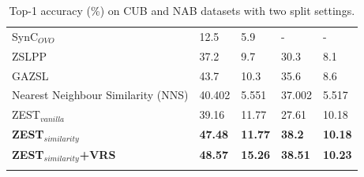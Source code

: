 \documentclass[11pt,a4paper]{article}
\begin{document}
\begin{table}[t]
{\begin{tabular}{l|ll|ll}
SynC$_{OVO}$ \citet{changpinyo2016synthesized}      & 12.5                              & 5.9                                & -                                 & -                                  \\
ZSLPP \citet{elhoseiny2017link}                   & 37.2                              & 9.7                                & 30.3                              & 8.1                                \\
GAZSL \citet{zhu2018generative}                   & 43.7                              & 10.3                               & 35.6                              & 8.6                                \\ 
\hline
Nearest Neighbour Similarity (NNS) & 40.402                            & 5.551                              & 37.002                            & 5.517                              \\
ZEST$_{vanilla}$                                                                 & 39.16                            & 11.77                             & 27.61                            & 10.18                             \\
\hline
\textbf{ZEST$_{similarity}$}                                           & \textbf{47.48}                   & \textbf{11.77}                     & \textbf{38.2}                   & \textbf{10.18}                    \\
\hline
\textbf{ZEST$_{similarity}$+VRS}                                        & \textbf{48.57}                    & \textbf{15.26}                    & \textbf{38.51 }                   & \textbf{10.23 }                    \\ 
\Xhline{6\arrayrulewidth}
                 
\end{tabular}
}
\caption{Top-1 accuracy (\%) on CUB and NAB datasets with two split settings.}
\label{tab:results}
\end{table}
\end{document}
